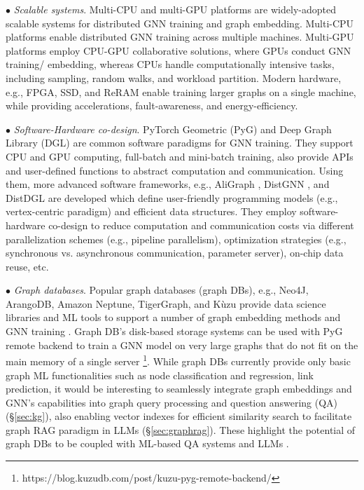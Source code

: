 \documentclass{sig-alternate-10pt}
\begin{document}
\noindent $\bullet$ {\em Scalable systems}.
Multi-CPU and multi-GPU platforms are widely-adopted scalable systems for distributed GNN training and graph embedding. Multi-CPU platforms enable distributed GNN training across multiple machines. Multi-GPU platforms employ CPU-GPU collaborative solutions, where GPUs conduct GNN training/ embedding, whereas CPUs handle computationally intensive tasks, including sampling, random walks, and workload partition. Modern hardware, e.g., FPGA, SSD, and ReRAM enable training larger graphs on a single machine, while providing accelerations, fault-awareness, and energy-efficiency.

\noindent $\bullet$ {\em Software-Hardware co-design}. PyTorch Geometric (PyG) and Deep Graph Library (DGL) are common software paradigms for GNN training. They support CPU and GPU computing, full-batch and mini-batch training, also provide APIs and user-defined functions to abstract computation and communication. Using them, more advanced software frameworks, e.g., AliGraph \cite{ZhuZYLZALZ19}, DistGNN \cite{MdMMMGHKAA21}, and DistDGL \cite{Zheng0WZSSGZK20} are developed which define user-friendly programming models (e.g., vertex-centric paradigm) and efficient data structures. They employ software-hardware co-design to reduce computation and communication costs via different parallelization schemes (e.g., pipeline parallelism), optimization strategies (e.g., synchronous vs. asynchronous communication, parameter server),
on-chip data reuse, etc.


\noindent $\bullet$ {\em Graph databases}. Popular graph databases (graph DBs), e.g., Neo4J, ArangoDB, Amazon Neptune, TigerGraph, and K\`{u}zu provide data science libraries and ML tools to support a number of graph embedding methods and GNN training \cite{Khan23}. Graph DB's disk-based storage systems can be used with PyG remote backend to train a GNN model on very large graphs that do not fit on the main memory of a single server \footnote{\scriptsize{{https://blog.kuzudb.com/post/kuzu-pyg-remote-backend/}}}. While graph DBs currently provide only basic graph ML functionalities such as node classification and regression, link prediction, it would be interesting to seamlessly integrate graph embeddings and GNN's capabilities into graph query processing and question answering (QA) (\S\ref{sec:kg}), also enabling vector indexes for efficient similarity search to facilitate graph RAG paradigm in LLMs (\S\ref{sec:graphrag}). These highlight the potential of graph DBs to be coupled with ML-based QA systems and LLMs \cite{abs-2410-03867}.
\end{document}
